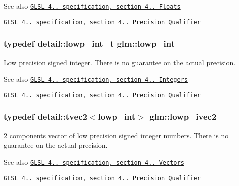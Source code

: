 \begin{DoxySeeAlso}{See also}
\href{http://www.opengl.org/registry/doc/GLSLangSpec.4.20.8.pdf}{\tt G\+L\+S\+L 4.. specification, section 4.. Floats} 

\href{http://www.opengl.org/registry/doc/GLSLangSpec.4.20.8.pdf}{\tt G\+L\+S\+L 4.. specification, section 4.. Precision Qualifier} 
\end{DoxySeeAlso}
\hypertarget{group__core__precision_ga4681244bf4a184734f03aa9df4e3d288}{}
\subsubsection[{lowp\+\_\+int}]{\setlength{\rightskip}{0pt plus 5cm}typedef detail\+::lowp\+\_\+int\+\_\+t {\bf glm\+::lowp\+\_\+int}}\label{group__core__precision_ga4681244bf4a184734f03aa9df4e3d288}
Low precision signed integer. There is no guarantee on the actual precision.

\begin{DoxySeeAlso}{See also}
\href{http://www.opengl.org/registry/doc/GLSLangSpec.4.20.8.pdf}{\tt G\+L\+S\+L 4.. specification, section 4.. Integers} 

\href{http://www.opengl.org/registry/doc/GLSLangSpec.4.20.8.pdf}{\tt G\+L\+S\+L 4.. specification, section 4.. Precision Qualifier} 
\end{DoxySeeAlso}
\hypertarget{group__core__precision_ga5e59209b39a7d334f8b4bad8c01ea045}{}
\subsubsection[{lowp\+\_\+ivec2}]{\setlength{\rightskip}{0pt plus 5cm}typedef detail\+::tvec2$<$lowp\+\_\+int$>$ {\bf glm\+::lowp\+\_\+ivec2}}\label{group__core__precision_ga5e59209b39a7d334f8b4bad8c01ea045}
2 components vector of low precision signed integer numbers. There is no guarantee on the actual precision.

\begin{DoxySeeAlso}{See also}
\href{http://www.opengl.org/registry/doc/GLSLangSpec.4.20.8.pdf}{\tt G\+L\+S\+L 4.. specification, section 4.. Vectors} 

\href{http://www.opengl.org/registry/doc/GLSLangSpec.4.20.8.pdf}{\tt G\+L\+S\+L 4.. specification, section 4.. Precision Qualifier} 
\end{DoxySeeAlso}
\hypertarget{group__core__precision_ga61fed1e59be72903080596ebbaf2fac5}{}
